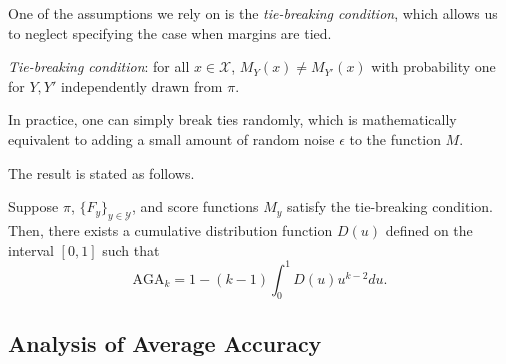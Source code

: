 \documentclass[twoside,11pt]{article}
\begin{document}
One of the assumptions we rely on is the \emph{tie-breaking condition}, which allows us to neglect specifying the case when
margins are tied.
\begin{definition}
\emph{Tie-breaking condition}: for all $x \in \mathcal{X}$,
$M_Y(x) \neq M_{Y'}(x)$
with probability one for $Y, Y'$ independently drawn from $\pi$.
\end{definition}
In practice, one can simply break ties randomly,
which is mathematically equivalent to adding a small amount of random
noise $\epsilon$ to the function $M$.

The result is stated as follows.

\begin{theorem}\label{theorem:avrisk_identity}
Suppose $\pi$, $\{F_y\}_{y \in \mathcal{Y}}$, and score functions $M_y$
satisfy the tie-breaking condition.  Then, there exists a cumulative
distribution function ${D}(u)$ defined on the interval $[0,1]$
such that
\begin{equation}\label{eq:avrisk_identity}
\text{AGA}_{k} = 1 - (k-1) \int_0^1 {D}(u) u^{k-2} du.
\end{equation}
\end{theorem}

\subsection{Analysis of Average Accuracy}

\end{document}
